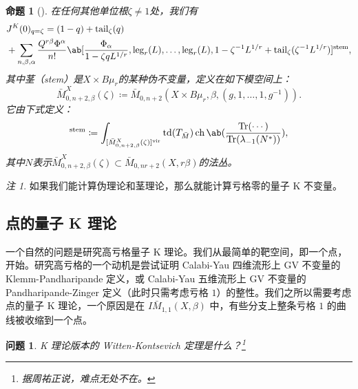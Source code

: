 \documentclass{amsart}
\newtheorem{prop}[thm]{命题}
\newtheorem{quest}[thm]{问题}
\theoremstyle{definition}
\theoremstyle{remark}
\newtheorem{rmk}[thm]{注}
\theoremstyle{plain}
\theoremstyle{definition}
\theoremstyle{remark}
\newcommand{\mr}[1]{\mathrm{#1}}
\newcommand{\on}[1]{\operatorname{#1}}
\newcommand{\1}{\mathbf{1}}
\newcommand{\2}{\mathbf{2}}
\newcommand{\3}{\mathbf{3}}
\newcommand{\vir}{\mr{vir}}
\begin{document}
\begin{prop}[{\cite{GiventalTonita2014}}]
    在任何其他单位根\(\zeta \neq 1\)处，我们有
    \begin{align*}
        &J^K(0)_{q = \zeta} = (1-q) + \mr{tail}_{\zeta}(q) \\
        &+ \sum_{n,\beta,\alpha} \frac{Q^{r\beta}\Phi^{\alpha}}{n!} \ab[\frac{\Phi_{\alpha}}{1-\zeta q L^{1/r}}, \mr{leg}_r(L), \ldots, \mr{leg}_r(L), 1 - \zeta^{-1}L^{1/r} + \mr{tail}_{\zeta}(\zeta^{-1} L^{1/r})]^{\mr{stem}},
    \end{align*}
    其中茎（stem）是\(X \times B\mu_r\)的某种伪不变量，定义在如下模空间上：
    \[ \bar{M}_{0,n+2,\beta}^X(\zeta) \coloneqq \bar{M}_{0,n+2}(X \times B\mu_r, \beta, (g, 1, \ldots, 1, g^{-1})). \]
    它由下式定义：
    \begin{align*}
        [\cdots]^{\mr{stem}} \coloneqq \int_{[\bar{M}_{0,n+2,\beta}^X(\zeta)]^{\vir}} \on{td}(T_{\bar{M}}) \on{ch}\ab(\frac{\on{Tr}(\cdots)}{\on{Tr}(\lambda_{-1}(N^*))}), 
    \end{align*}
    其中\(N\)表示\(\bar{M}_{0,n+2,\beta}^X(\zeta) \subset \bar{M}_{0,nr+2}(X, r\beta)\)的法丛。
\end{prop}

\begin{rmk}
    如果我们能计算伪理论和茎理论，那么就能计算亏格零的量子 K 不变量。
\end{rmk}

\subsection{点的量子 K 理论}%
\label{sub:Quantum K-theory of a point}

一个自然的问题是研究高亏格量子 K 理论。我们从最简单的靶空间，即一个点，开始。研究高亏格的一个动机是尝试证明 Calabi-Yau 四维流形上 GV 不变量的 Klemm-Pandharipande 定义，或 Calabi-Yau 五维流形上 GV 不变量的 Pandharipande-Zinger 定义（此时只需考虑亏格 \(1\)）的整性。我们之所以需要考虑点的量子 K 理论，一个原因是在 \(I\bar{M}_{1,1}(X, \beta)\) 中，有些分支上整条亏格 \(1\) 的曲线被收缩到一个点。

\begin{quest}
    K 理论版本的 Witten-Kontsevich 定理是什么？\footnote{据周祐正说，难点无处不在。}
\end{quest}
\end{document}
